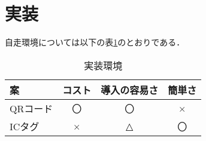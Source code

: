 

\section{実装}

自走環境については以下の表\ref{jissou}のとおりである．


\begin{table}[htb]
\begin{center}
\caption{実装環境}
\begin{tabular}{|l||c|c|c|} \hline
案 & コスト & 導入の容易さ & 簡単さ \\ \hline \hline
QRコード & 〇 & 〇 & × \\
ICタグ & × & △ & 〇 \\ \hline
\end{tabular}
\label{jissou}
  \end{center}
\end{table}